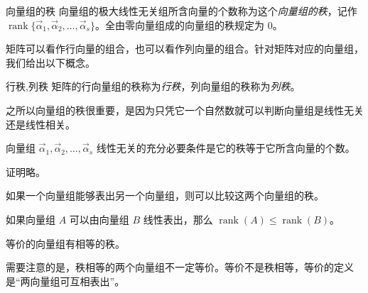\begin{definition}{向量组的秩}
	向量组的极大线性无关组所含向量的个数称为这个\emph{向量组的秩}，记作 $\operatorname{rank} \{\vec \alpha_1, \vec \alpha_2, \ldots, \vec \alpha_s\}$。全由零向量组成的向量组的秩规定为 $0$。
\end{definition}

矩阵可以看作行向量的组合，也可以看作列向量的组合。针对矩阵对应的向量组，我们给出以下概念。

\begin{definition}{行秩,列秩}
	矩阵的行向量组的秩称为\emph{行秩}，列向量组的秩称为\emph{列秩}。
\end{definition}

之所以向量组的秩很重要，是因为只凭它一个自然数就可以判断向量组是线性无关还是线性相关。

\begin{theorem}
	向量组 $\vec \alpha_1, \vec \alpha_2, \ldots, \vec \alpha_s$ 线性无关的充分必要条件是它的秩等于它所含向量的个数。
\end{theorem}

证明略。

如果一个向量组能够表出另一个向量组，则可以比较这两个向量组的秩。

\begin{theorem}
	如果向量组 $A$ 可以由向量组 $B$ 线性表出，那么 $\operatorname{rank}(A) \le \operatorname{rank}(B)$。
\end{theorem}

\begin{theorem}
	等价的向量组有相等的秩。
\end{theorem}

需要注意的是，秩相等的两个向量组不一定等价。等价不是秩相等，等价的定义是“两向量组可互相表出”。